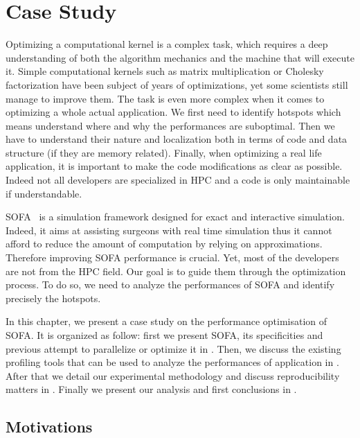 \chapter{Case Study}
\label{chap:perf}

Optimizing a computational kernel is a complex task, which requires a deep understanding of both the algorithm mechanics and the machine that will execute it.
Simple computational kernels such as matrix multiplication or Cholesky factorization have been subject of years of optimizations, yet some scientists still manage to improve them.
The task is even more complex when it comes to optimizing a whole actual application.
We first need to identify hotspots which means understand where and why the performances are suboptimal.
Then we have to understand their nature and localization both in terms of code and data structure (if they are memory related).
Finally, when optimizing a real life application, it is important to make the code modifications as clear as possible.
Indeed not all developers are specialized in \gls{HPC} and a code is only maintainable if understandable.

\gls{SOFA}~\cite{Allard07SOFA} is a simulation framework designed for exact and interactive simulation.
Indeed, it aims at assisting surgeons with real time simulation thus  it cannot afford to reduce the amount of computation by relying on approximations.
Therefore improving \gls{SOFA} performance is crucial.
Yet, most of the developers are not from the \gls{HPC} field.
Our goal is to guide them through the optimization process.
To do so, we need to analyze the  performances of \gls{SOFA} and identify precisely the hotspots.

In this chapter, we present a case study on the performance optimisation of \gls{SOFA}.
It is organized as follow: first we present \gls{SOFA}, its specificities and previous attempt to parallelize or optimize it in .
Then, we discuss the existing profiling tools that can be used to analyze the performances of application in .
After that we detail our experimental methodology and discuss reproducibility matters in .
Finally we present our analysis and first conclusions in .

\section{Motivations}
\label{sec:motivations}

